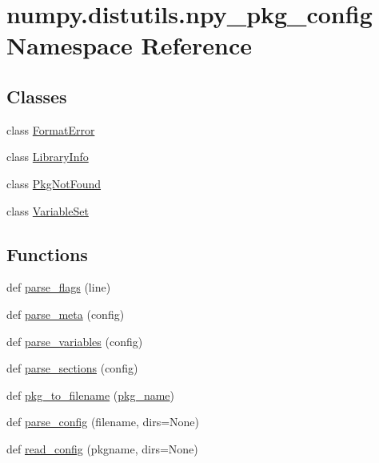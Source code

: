 \hypertarget{namespacenumpy_1_1distutils_1_1npy__pkg__config}{}\section{numpy.\+distutils.\+npy\+\_\+pkg\+\_\+config Namespace Reference}
\label{namespacenumpy_1_1distutils_1_1npy__pkg__config}
\subsection*{Classes}
\begin{DoxyCompactItemize}
\item 
class \hyperlink{classnumpy_1_1distutils_1_1npy__pkg__config_1_1FormatError}{Format\+Error}
\item 
class \hyperlink{classnumpy_1_1distutils_1_1npy__pkg__config_1_1LibraryInfo}{Library\+Info}
\item 
class \hyperlink{classnumpy_1_1distutils_1_1npy__pkg__config_1_1PkgNotFound}{Pkg\+Not\+Found}
\item 
class \hyperlink{classnumpy_1_1distutils_1_1npy__pkg__config_1_1VariableSet}{Variable\+Set}
\end{DoxyCompactItemize}
\subsection*{Functions}
\begin{DoxyCompactItemize}
\item 
def \hyperlink{namespacenumpy_1_1distutils_1_1npy__pkg__config_a6c9fdcbb0ade8da593d7f9288f6a5cd9}{parse\+\_\+flags} (line)
\item 
def \hyperlink{namespacenumpy_1_1distutils_1_1npy__pkg__config_a4ac1edb29dd82acb1851e242ed2393e3}{parse\+\_\+meta} (config)
\item 
def \hyperlink{namespacenumpy_1_1distutils_1_1npy__pkg__config_abe173b368876a4eea45942ac8f77396a}{parse\+\_\+variables} (config)
\item 
def \hyperlink{namespacenumpy_1_1distutils_1_1npy__pkg__config_a044f447f70c3544396d4e12bba78a7c5}{parse\+\_\+sections} (config)
\item 
def \hyperlink{namespacenumpy_1_1distutils_1_1npy__pkg__config_a447085e582cd2c098ef6eb72e61d5b42}{pkg\+\_\+to\+\_\+filename} (\hyperlink{namespacenumpy_1_1distutils_1_1npy__pkg__config_aa13318cf4a334a4fb3c94023049ab3eb}{pkg\+\_\+name})
\item 
def \hyperlink{namespacenumpy_1_1distutils_1_1npy__pkg__config_af8fc8b8c1a3b60775877f3f4437e0d38}{parse\+\_\+config} (filename, dirs=None)
\item 
def \hyperlink{namespacenumpy_1_1distutils_1_1npy__pkg__config_aad3cf0828f355f0cbd2dbea5d0b99a60}{read\+\_\+config} (pkgname, dirs=None)
\end{DoxyCompactItemize}
